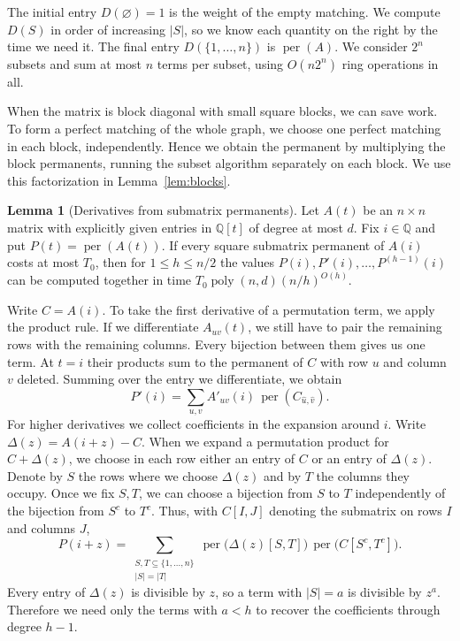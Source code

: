 \documentclass{article}
\theoremstyle{definition}
\newtheorem{lemma}[theorem]{Lemma}
\DeclareMathOperator{\per}{per}
\begin{document}
The initial entry \(D(\varnothing)=1\) is the weight of the empty
matching. We compute \(D(S)\) in order of increasing \(|S|\), so we
know each quantity on the right by the time we need it. The final
entry \(D(\{1,\ldots,n\})\) is \(\per(A)\). We consider \(2^n\) subsets
and sum at most \(n\) terms per subset, using \(O(n2^n)\) ring
operations in all.

When the matrix is block diagonal with small square blocks, we can
save work. To form a perfect matching of the whole graph, we choose
one perfect matching in each block, independently. Hence we obtain the
permanent by multiplying the block permanents, running the subset algorithm
separately on each block. We use this factorization in
Lemma~\ref{lem:blocks}.

\begin{lemma}[Derivatives from submatrix permanents]\label{lem:derivatives}
Let \(A(t)\) be an \(n\times n\) matrix with explicitly given entries in
\(\mathbb Q[t]\) of degree at most \(d\). Fix \(i\in\mathbb Q\) and put
\(P(t)=\per(A(t))\). If every square submatrix
permanent of \(A(i)\) costs at most \(T_0\), then for \(1\le h\le n/2\) the
values \(P(i),P'(i),\ldots,P^{(h-1)}(i)\) can be computed together in time
\(T_0\operatorname{poly}(n,d)(n/h)^{O(h)}\).
\end{lemma}

Write \(C=A(i)\). To take the first derivative of a permutation term,
we apply the product rule. If we differentiate \(A_{uv}(t)\), we still
have to pair the remaining rows with the remaining columns. Every
bijection between them gives us one term. At \(t=i\) their products
sum to the permanent of \(C\) with row \(u\) and column \(v\)
deleted. Summing over the entry we differentiate, we obtain
\[
    P'(i)=\sum_{u,v} A'_{uv}(i)\,\per(C_{\widehat u,\widehat v}).
\]
For higher derivatives we collect coefficients in the expansion around
\(i\). Write \(\Delta(z)=A(i+z)-C\). When we expand a permutation
product for \(C+\Delta(z)\), we choose in each row either an entry of
\(C\) or an entry of \(\Delta(z)\). Denote by \(S\) the rows where we
choose \(\Delta(z)\) and by \(T\) the columns they occupy. Once we
fix \(S,T\), we can choose a bijection from \(S\)
to \(T\) independently of the bijection from \(S^c\) to \(T^c\). Thus,
with \(C[I,J]\) denoting the submatrix on rows \(I\) and columns \(J\),
\[
    P(i+z)=\sum_{\substack{S,T\subseteq\{1,\ldots,n\}\\ |S|=|T|}}
        \per\bigl(\Delta(z)[S,T]\bigr)\,\per\bigl(C[S^c,T^c]\bigr).
\]
Every entry of \(\Delta(z)\) is divisible by \(z\), so a term with
\(|S|=a\) is divisible by \(z^a\). Therefore we need only the terms
with \(a<h\) to recover the coefficients through degree \(h-1\).
\end{document}
